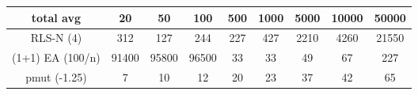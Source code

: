 \begin{tabular}[h]{ccccccccc}
total avg&20&50&100&500&1000&5000&10000&50000\\\hline
RLS-N (4)&312&127&244&227&427&2210&4260&21550\\
(1+1) EA (100/n)&91400&95800&96500&33&33&49&67&227\\
pmut (-1.25)&7&10&12&20&23&37&42&65\\
\end{tabular}

